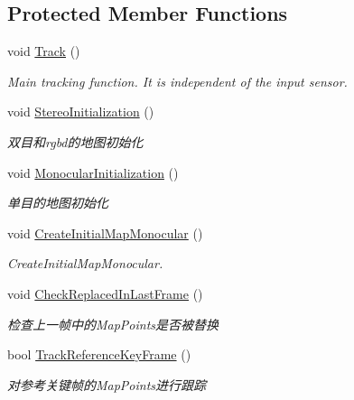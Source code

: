 \subsection*{Protected Member Functions}
\begin{DoxyCompactItemize}
\item 
void \mbox{\hyperlink{class_o_r_b___s_l_a_m2_1_1_tracking_af1f2c9c533642d8c33854540e90d1918}{Track}} ()
\begin{DoxyCompactList}\small\item\em Main tracking function. It is independent of the input sensor. \end{DoxyCompactList}\item 
void \mbox{\hyperlink{class_o_r_b___s_l_a_m2_1_1_tracking_ad3da849e4204d766e5db4ac47b52132c}{Stereo\+Initialization}} ()
\begin{DoxyCompactList}\small\item\em 双目和rgbd的地图初始化 \end{DoxyCompactList}\item 
void \mbox{\hyperlink{class_o_r_b___s_l_a_m2_1_1_tracking_a7e81c68bb6ced27fcbfa2edec38ef6e0}{Monocular\+Initialization}} ()
\begin{DoxyCompactList}\small\item\em 单目的地图初始化 \end{DoxyCompactList}\item 
void \mbox{\hyperlink{class_o_r_b___s_l_a_m2_1_1_tracking_afeb077c81cd700d779348b80698086e8}{Create\+Initial\+Map\+Monocular}} ()
\begin{DoxyCompactList}\small\item\em Create\+Initial\+Map\+Monocular. \end{DoxyCompactList}\item 
void \mbox{\hyperlink{class_o_r_b___s_l_a_m2_1_1_tracking_a2ca003d3234b2e8444f70dcd2132126f}{Check\+Replaced\+In\+Last\+Frame}} ()
\begin{DoxyCompactList}\small\item\em 检查上一帧中的\+Map\+Points是否被替换 \end{DoxyCompactList}\item 
bool \mbox{\hyperlink{class_o_r_b___s_l_a_m2_1_1_tracking_a737c5409c93844353561a0fe724ed1c2}{Track\+Reference\+Key\+Frame}} ()
\begin{DoxyCompactList}\small\item\em 对参考关键帧的\+Map\+Points进行跟踪 \end{DoxyCompactList}\item 

\end{DoxyCompactItemize}
